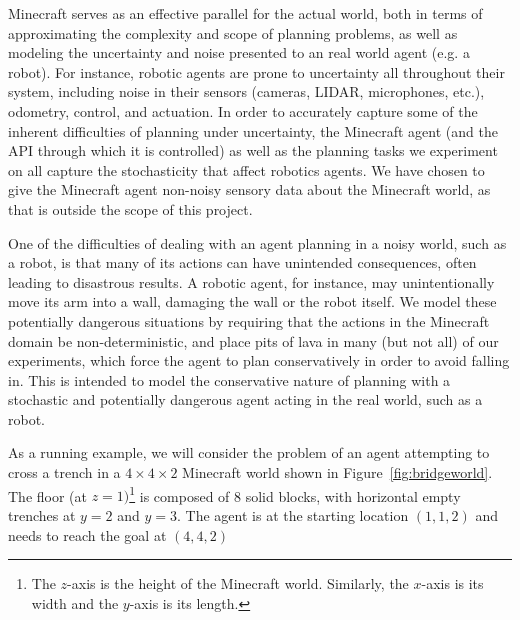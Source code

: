 \documentclass[]{article}
\begin{document}
Minecraft serves as an effective parallel for the actual world, both
in terms of approximating the complexity and scope of planning
problems, as well as modeling the uncertainty and noise presented to
an real world agent (e.g. a robot).  For instance, robotic agents are
prone to uncertainty all throughout their system, including noise in
their sensors (cameras, LIDAR, microphones, etc.), odometry, control,
and actuation.  In order to accurately capture some of the inherent
difficulties of planning under uncertainty, the Minecraft agent (and
the API through which it is controlled) as well as the planning tasks
we experiment on all capture the stochasticity that affect robotics
agents.  We have chosen to give the Minecraft agent non-noisy sensory
data about the Minecraft world, as that is outside the scope of this
project.

One of the difficulties of dealing with an agent planning in a noisy world, such as a robot, 
is that many of its actions can have unintended consequences, often leading to disastrous results. A robotic agent,
for instance, may unintentionally move its arm into a wall, damaging the wall or the robot itself. We
model these potentially dangerous situations by requiring that the actions in the
Minecraft domain be non-deterministic, and place pits of lava in many (but not all)
of our experiments, which force the agent to plan conservatively in order to avoid
falling in. This is intended to model the conservative nature of planning with a stochastic and potentially
dangerous agent acting in the real world, such as a robot.

As a running example, we will consider the problem of an agent attempting
to cross a trench in a $4 \times 4 \times 2$ Minecraft world shown in
Figure~\ref{fig:bridgeworld}. The floor (at $z = 1)$\footnote{The
  $z$-axis is the height of the Minecraft world. Similarly, the
  $x$-axis is its width and the $y$-axis is its length.} is composed
of 8 solid blocks, with horizontal empty trenches at $y = 2$ and $y =
3$. The agent is at the starting location $(1, 1, 2)$ and needs to
reach the goal at $(4,4,2)$
\end{document}
